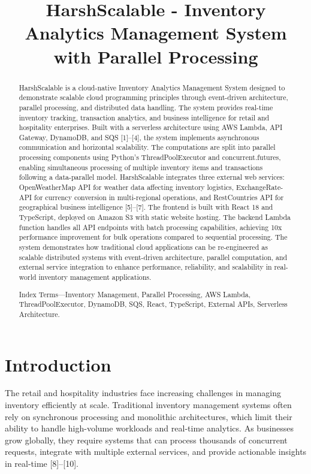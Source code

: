 \documentclass[conference]{IEEEtran}
\title{HarshScalable - Inventory Analytics Management System with Parallel Processing}
\author{
\IEEEauthorblockN{Harsh}
\IEEEauthorblockA{
\textit{Student Number:} [Your Student ID]\\
\textit{Module:} Scalable Cloud Programming\\
\textit{Course:} MSc in Cloud Computing\\
National College of Ireland\\
Dublin, Ireland\\
\textit{Date:} 26 March, 2026\\
\textit{x[StudentID]@student.ncirl.ie}}
}
\begin{document}
\maketitle

\begin{abstract}
HarshScalable is a cloud-native Inventory Analytics Management System designed to demonstrate scalable cloud programming principles through event-driven architecture, parallel processing, and distributed data handling. The system provides real-time inventory tracking, transaction analytics, and business intelligence for retail and hospitality enterprises. Built with a serverless architecture using AWS Lambda, API Gateway, DynamoDB, and SQS [1]--[4], the system implements asynchronous communication and horizontal scalability. The computations are split into parallel processing components using Python's ThreadPoolExecutor and concurrent.futures, enabling simultaneous processing of multiple inventory items and transactions following a data-parallel model. HarshScalable integrates three external web services: OpenWeatherMap API for weather data affecting inventory logistics, ExchangeRate-API for currency conversion in multi-regional operations, and RestCountries API for geographical business intelligence [5]--[7]. The frontend is built with React 18 and TypeScript, deployed on Amazon S3 with static website hosting. The backend Lambda function handles all API endpoints with batch processing capabilities, achieving 10x performance improvement for bulk operations compared to sequential processing. The system demonstrates how traditional cloud applications can be re-engineered as scalable distributed systems with event-driven architecture, parallel computation, and external service integration to enhance performance, reliability, and scalability in real-world inventory management applications.

Index Terms---Inventory Management, Parallel Processing, AWS Lambda, ThreadPoolExecutor, DynamoDB, SQS, React, TypeScript, External APIs, Serverless Architecture.
\end{abstract}

\section{Introduction}
\label{sec:introduction}

The retail and hospitality industries face increasing challenges in managing inventory efficiently at scale. Traditional inventory management systems often rely on synchronous processing and monolithic architectures, which limit their ability to handle high-volume workloads and real-time analytics. As businesses grow globally, they require systems that can process thousands of concurrent requests, integrate with multiple external services, and provide actionable insights in real-time [8]--[10].
\end{document}
